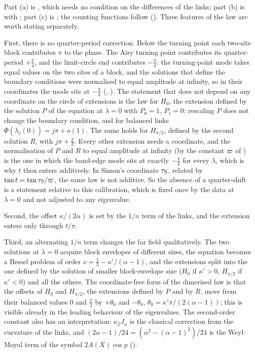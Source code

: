 Part (a) is , which needs no condition on the differences of the links; part (b) is
 with ; part (c) is ; the counting functions
follow (). Three features of the law are worth stating separately.

First, there is no quarter-period correction. Below the turning point each two-site block contributes
$\pi$ to the phase. The Airy turning point contributes its quarter-period $+\frac\pi4$, and the
limit-circle end contributes $-\frac\pi4$: the turning-point mode takes equal values on the two sites of
a block, and the solutions that define the boundary conditions were normalised to equal amplitude at
infinity, so in their coordinates the mode sits at $-\frac\pi4$ (, ).
The statement that does not depend on any coordinate on the circle of extensions is the law for $H_0$,
the extension defined by the solution $P$ of the equation at $\lambda=0$ with $P_0=1$, $P_1=0$:
rescaling $P$ does not change the boundary condition, and for balanced links
$\Phi(\lambda_j(0))=j\pi+o(1)$. The same holds for $H_{\pi/2}$, defined by the second solution $R$, with
$j\pi+\frac\pi2$. Every other extension needs a coordinate, and the normalisation of $P$ and $R$ to
equal amplitude at infinity (by the constant $\varpi$ of ) is the one in which the
band-edge mode sits at exactly $-\frac\pi4$ for every $\lambda$, which is why $t$ then enters additively.
In Simon's coordinate $\tau_{\rm S}$, related by $\tan t=\tan\tau_{\rm S}/\varpi$, the same law is not additive. So the absence
of a quarter-shift is a statement relative to this calibration, which is fixed once by the data at
$\lambda=0$ and not adjusted to any eigenvalue.

Second, the offset $\kappa/(2\alpha)$ is set by the $1/n$ term of the links, and the extension enters only
through $t/\pi$.

Third, an alternating $1/n$ term changes the far field qualitatively. The two solutions at $\lambda=0$
acquire block envelopes of different sizes, the equation becomes a Bessel problem of order
$\nu=\frac12-\kappa'/(\alpha-1)$, and the extensions split into the one defined by the solution of
smaller block-envelope size ($H_0$ if $\kappa'>0$, $H_{\pi/2}$ if $\kappa'<0$) and all the others. The
coordinate-free form of the dimerised law is that the offsets of $H_0$ and $H_{\pi/2}$, the extensions
defined by $P$ and by $R$, move from their balanced values $0$ and $\frac\pi2$ by $+\theta_0$ and
$-\theta_0$, $\theta_0=\kappa'\pi/(2(\alpha-1))$; this is visible already in the leading behaviour of the
eigenvalues. The second-order constant also has an interpretation: $\kappa_2J_\alpha$ is the classical
correction from the curvature of the links, and $(2\alpha-1)/24=(\alpha^2-(\alpha-1)^2)/24$ is the
Weyl--Moyal term of the symbol $2A(X)\cos p$ ().

